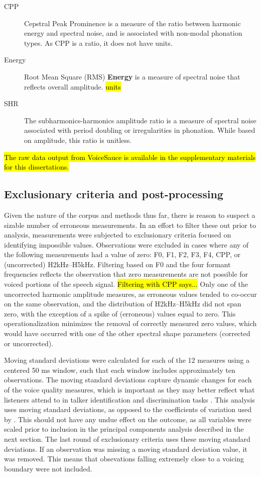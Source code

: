 \begin{description}
    \item[CPP] Cepstral Peak Prominence is a measure of the ratio between harmonic energy and spectral noise, and is associated with non-modal phonation types. As CPP is a ratio, it does not have units.
    \item[Energy] Root Mean Square (RMS) \textbf{Energy} is a measure of spectral noise that reflects overall amplitude. \hl{units}
    \item[SHR] The subharmonics-harmonics amplitude ratio is a measure of spectral noise associated with period doubling or irregularities in phonation. While based on amplitude, this ratio is unitless. 
\end{description}

\hl{The raw data output from VoiceSauce is available in the supplementary materials for this dissertations.} %

\subsection{Exclusionary criteria and post-processing}

Given the nature of the corpus and methods thus far, there is reason to suspect a sizable number of erroneous measurements. In an effort to filter these out prior to analysis, measurements were subjected to exclusionary criteria focused on identifying impossible values. Observations were excluded in cases where any of the following measurements had a value of zero: F0, F1, F2, F3, F4, CPP, or (uncorrected) H2kHz--H5kHz. Filtering based on F0 and the four formant frequencies reflects the observation that zero measurements are not possible for voiced portions of the speech signal. \hl{Filtering with CPP says...} Only one of the uncorrected harmonic amplitude measures, as erroneous values tended to co-occur on the same observation, and the distribution of H2kHz--H5kHz did not span zero, with the exception of a spike of (erroneous) values equal to zero. This operationalization minimizes the removal of correctly measured zero values, which would have occurred with one of the other spectral shape parameters (corrected or uncorrected). 

Moving standard deviations were calculated for each of the 12 measures using a centered 50 ms window, such that each window includes approximately ten observations. The moving standard deviations capture dynamic changes for each of the voice quality measures, which is important as they may better reflect what listeners attend to in talker identification and discrimination tasks \citep{lee_2019_acoustic-paper}. This analysis uses moving standard deviations, as opposed to the coefficients of variation used by \citet{lee_2019_acoustic-paper}. This should not have any undue effect on the outcome, as all variables were scaled prior to inclusion in the principal components analysis described in the next section. The last round of exclusionary criteria uses these moving standard deviations. If an observation was missing a moving standard deviation value, it was removed. This means that obsevations falling extremely close to a voicing boundary were not included. 

